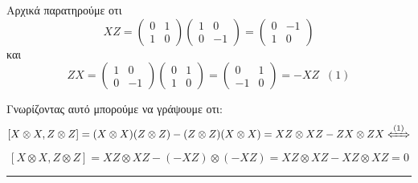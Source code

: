\documentclass[12pt]{article}
\begin{document}
\section*{{}}
Αρχικά παρατηρούμε οτι 
$$ XZ = \begin{pmatrix*}
    0 & 1 \\ 1 & 0
\end{pmatrix*}\begin{pmatrix*}
    1 & 0 \\ 0 & -1
\end{pmatrix*}   = \begin{pmatrix*}
    0 & -1 \\ 1 & 0
\end{pmatrix*} $$και
$$ ZX = \begin{pmatrix*}
    1 & 0 \\ 0 & -1
\end{pmatrix*} \begin{pmatrix*}
    0 & 1 \\ 1 & 0
\end{pmatrix*}  = \begin{pmatrix*}
    0 & 1 \\ -1 & 0
\end{pmatrix*} = -XZ \;\;(1)$$

Γνωρίζοντας αυτό μπορούμε να γράψουμε οτι:
$$[X\otimes X,Z\otimes Z] =(X\otimes X)(Z\otimes Z )- (Z\otimes Z)(X\otimes X) = XZ\otimes XZ - ZX\otimes ZX \xLeftrightarrow{(1)} $$
$$[X\otimes X,Z\otimes Z] = XZ\otimes XZ - (-XZ)\otimes (-XZ) =XZ\otimes XZ - XZ\otimes XZ = 0 $$
\rule{\textwidth}{.5pt}

\section*{{}}
\end{document}

